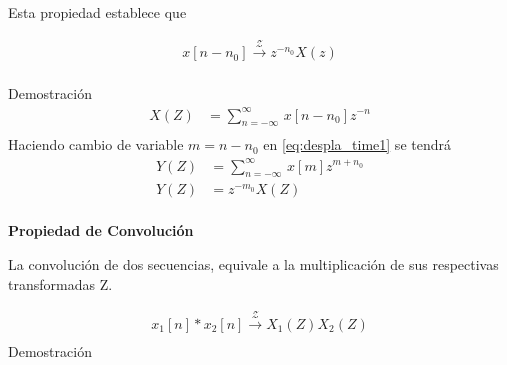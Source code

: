 \documentclass[12pt]{article}
\begin{document}
Esta propiedad establece que\par

\begin{equation}
    \begin{split}
        x[n-n_{0}]\xrightarrow{\mathscr{Z}}z^{-n_{0}}X(z)\\
    \end{split}
    \label{eq:despla_time}
\end{equation}

Demostración
\begin{equation}
    \begin{split}
        X(Z)&=\displaystyle\sum_{n=-\infty}^{\infty}\,x[n-n_{0}]z^{-n}\\
    \end{split}
    \label{eq:despla_time1}
\end{equation}
Haciendo cambio de variable $m=n-n_{0}$ en \ref{eq:despla_time1} se tendrá
\begin{equation}
    \begin{split}
        Y(Z)&=\displaystyle\sum_{n=-\infty}^{\infty}\,x[m]z^{m+n_{0}}\\
        Y(Z)&=z^{-m_{0}}X(Z)\\
    \end{split}
    \label{eq:despla_time2}
\end{equation}

\textbf{Propiedad de Convolución}
\vspace{5mm}

La convolución de dos secuencias, equivale a la multiplicación de sus respectivas transformadas Z.\par
\begin{equation}
    \begin{split}
        x_{1}[n]*x_{2}[n]\xrightarrow{\mathscr{Z}}X_{1}(Z)X_{2}(Z)\\
    \end{split}
    \label{eq:convolu}
\end{equation}
Demostración
\end{document}
